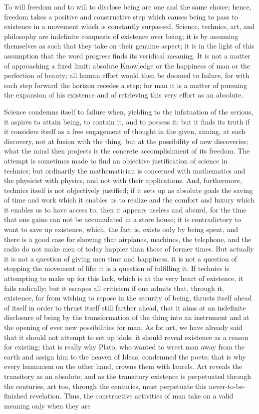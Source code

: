\documentclass[11pt]{article}
\begin{document}
{{To will freedom and to will to disclose being are one and the same choice; hence, freedom takes a positive and constructive step which causes being to pass to existence in a movement which is constantly surpassed. Science, technics, art, and philosophy are indefinite conquests of existence over being; it is by assuming themselves as such that they take on their genuine aspect; it is in the light of this assumption that the word progress finds its veridical meaning. It is not a matter of approaching a fixed limit: absolute Knowledge or the happiness of man or the perfection of beauty; all human effort would then be doomed to failure, for with each step forward the horizon recedes a step; for man it is a matter of pursuing the expansion of his existence and of retrieving this very effort as an absolute.

Science condemns itself to failure when, yielding to the infatuation of the serious, it aspires to attain being, to contain it, and to possess it; but it finds its truth if it considers itself as a free engagement of thought in the given, aiming, at each discovery, not at fusion with the thing, but at the possibility of new discoveries; what the mind then projects is the concrete accomplishment of its freedom. The attempt is sometimes made to find an objective justification of science in technics; but ordinarily the mathematician is concerned with mathematics and the physicist with physics, and not with their applications. And, furthermore, technics itself is not objectively justified; if it sets up as absolute goals the saving of time and work which it enables us to realize and the comfort and luxury which it enables us to have access to, then it appears useless and absurd, for the time that one gains can not be accumulated in a store house; it is contradictory to want to save up existence, which, the fact is, exists only by being spent, and there is a good case for showing that airplanes, machines, the telephone, and the radio do not make men of today happier than those of former times. But actually it is not a question of giving men time and happiness, it is not a question of stopping the movement of life: it is a question of fulfilling it. If technics is attempting to make up for this lack, which is at the very heart of existence, it fails radically; but it escapes all criticism if one admits that, through it, existence, far from wishing to repose in the security of being, thrusts itself ahead of itself in order to thrust itself still farther ahead, that it aims at an indefinite disclosure of being by the transformation of the thing into an instrument and at the opening of ever new possibilities for man. As for art, we have already said that it should not attempt to set up idols; it should reveal existence as a reason for existing; that is really why Plato, who wanted to wrest man away from the earth and assign him to the heaven of Ideas, condemned the poets; that is why every humanism on the other hand, crowns them with laurels. Art reveals the transitory as an absolute; and as the transitory existence is perpetuated through the centuries, art too, through the centuries, must perpetuate this never-to-be-finished revelation. Thus, the constructive activities of man take on a valid meaning only when they are }}
\end{document}
